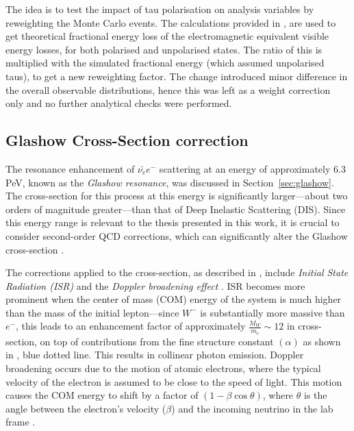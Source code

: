 The idea is to test the impact of tau polarisation on analysis variables by reweighting the Monte Carlo events. The calculations provided in \cite{Tau_Polarisation}, are used to get theoretical fractional energy loss of the electromagnetic equivalent visible energy losses, for both polarised and unpolarised states. The ratio of this is multiplied with the simulated fractional energy (which assumed unpolarised taus), to get a new reweighting factor. The change introduced minor difference in the overall observable distributions, hence this was left as a weight correction only and no further analytical checks were performed.

\subsection{Glashow Cross-Section correction}
\label{sec:glashow_correction}
The resonance enhancement of \(\bar{\nu_e}e^-\) scattering at an energy of approximately 6.3 PeV, known as the \emph{Glashow resonance}, was discussed in Section~\ref{sec:glashow}. The cross-section for this process at this energy is significantly larger—about two orders of magnitude greater—than that of Deep Inelastic Scattering (DIS). Since this energy range is relevant to the thesis presented in this work, it is crucial to consider second-order QCD corrections, which can significantly alter the Glashow cross-section .

The corrections applied to the cross-section, as described in \cite{glashow_correcttion1}, include \emph{Initial State Radiation (ISR)}  and the \emph{Doppler broadening effect} . ISR becomes more prominent when the center of mass (COM) energy of the system is much higher than the mass of the initial lepton—since \(W^-\) is substantially more massive than \(e^-\), this leads to an enhancement factor of approximately \(\frac{M_W}{m_e} \sim 12\) in cross-section, on top of contributions from the fine structure constant \((\alpha)\) as shown in , blue dotted line. This results in collinear photon emission. Doppler broadening occurs due to the motion of atomic electrons, where the typical velocity of the electron is assumed to be close to the speed of light. This motion causes the COM energy to shift by a factor of \((1 - \beta \cos\theta)\), where \(\theta\) is the angle between the electron's velocity (\(\beta\)) and the incoming neutrino in the lab frame \cite{glashow_correcttion4}. 

